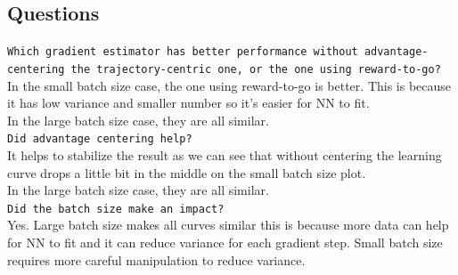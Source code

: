 \documentclass[12pt]{article}
\begin{document}
	\subsection{Questions}

	\texttt{Which gradient estimator has better performance without advantage-centering the trajectory-centric one, or the one using reward-to-go?}\\
	In the small batch size case, the one using reward-to-go is better.  This is because it has low variance and smaller number so it's easier for NN to fit.\\
	In the large batch size case, they are all similar.\\
	\hfill \linebreak
	\texttt{Did advantage centering help?}\\
	It helps to stabilize the result as we can see that without centering the learning curve drops a little bit in the middle on the small batch size plot.\\
	In the large batch size case, they are all similar.\\
	
	\hfill \linebreak
	\texttt{Did the batch size make an impact?}\\
	Yes. Large batch size makes all curves similar this is because more data can help for NN to fit and it can reduce variance for each gradient step. Small batch size requires more careful manipulation to reduce variance.
	
\end{document}

